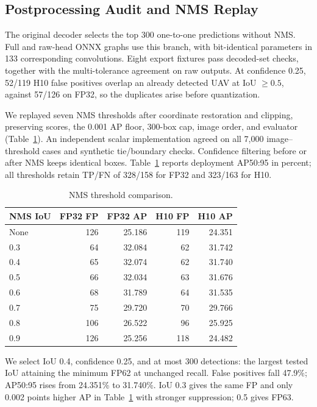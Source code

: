 \documentclass[lettersize,journal]{IEEEtran}
\begin{document}
\subsection{Postprocessing Audit and NMS Replay}
The original decoder selects the top 300 one-to-one predictions without NMS. Full and raw-head ONNX graphs use this branch, with bit-identical parameters in 133 corresponding convolutions. Eight export fixtures pass decoded-set checks, together with the multi-tolerance agreement on raw outputs. At confidence 0.25, 52/119 H10 false positives overlap an already detected UAV at IoU $\geq0.5$, against 57/126 on FP32, so the duplicates arise before quantization.

We replayed seven NMS thresholds after coordinate restoration and clipping, preserving scores, the 0.001 AP floor, 300-box cap, image order, and evaluator (Table~\ref{tab:nms}). An independent scalar implementation agreed on all 7,000 image--threshold cases and synthetic tie/boundary checks. Confidence filtering before or after NMS keeps identical boxes. Table~\ref{tab:nms} reports deployment AP50:95 in percent; all thresholds retain TP/FN of 328/158 for FP32 and 323/163 for H10.

\begin{table}[t]
\caption{NMS threshold comparison.}
\label{tab:nms}
\centering\small
\begin{tabular}{lrrrr}
\hline
NMS IoU & FP32 FP & FP32 AP & H10 FP & H10 AP\\
\hline
None & 126 & 25.186 & 119 & 24.351\\
0.3 & 64 & 32.084 & 62 & 31.742\\
0.4 & 65 & 32.074 & 62 & 31.740\\
0.5 & 66 & 32.034 & 63 & 31.676\\
0.6 & 68 & 31.789 & 64 & 31.535\\
0.7 & 75 & 29.720 & 70 & 29.766\\
0.8 & 106 & 26.522 & 96 & 25.925\\
0.9 & 126 & 25.256 & 118 & 24.482\\
\hline
\end{tabular}
\end{table}

We select IoU 0.4, confidence 0.25, and at most 300 detections: the largest tested IoU attaining the minimum FP62 at unchanged recall. False positives fall 47.9\%; AP50:95 rises from 24.351\% to 31.740\%. IoU 0.3 gives the same FP and only 0.002 points higher AP in Table~\ref{tab:nms} with stronger suppression; 0.5 gives FP63.
\end{document}

